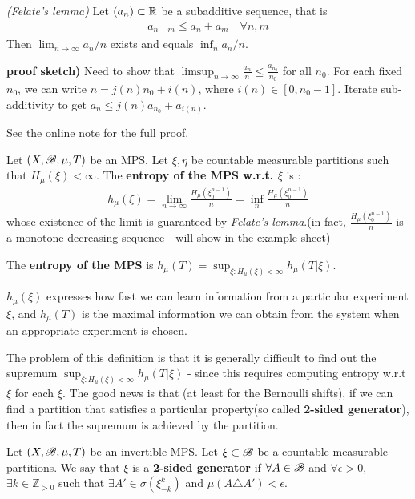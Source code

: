 \documentclass[10pt,a4paper]{report}
\newenvironment{proof}
{\begin{changemargin}{1cm}{0.5cm} 
	}%
	{\end{changemargin}
}
\begin{document}
\lem \emph{(Felate's lemma)} Let $(a_n)\subset \mathbb{R}$ be a subadditive sequence, that is
\begin{align*}
a_{n+m} \leq a_n + a_m \quad \forall n,m
\end{align*}
Then $\lim_{n\rightarrow \infty} a_n/n$ exists and equals $\inf_{n} a_n /n $.
\begin{proof}
\textbf{proof sketch)} Need to show that $\limsup_{n\rightarrow \infty} \frac{a_n}{n} \leq \frac{a_{n_0}}{n_0}$ for all $n_0$. For each fixed $n_0$, we can write $n = j(n)n_0 + i(n)$, where $i(n) \in [0,n_0-1]$. Iterate sub-additivity to get $a_n \leq j(n) a_{n_0} + a_{i(n)}$.

\quad See the online note for the full proof.
\end{proof}
\s

 Let $(X,\mathscr{B}, \mu, T)$ be an MPS. Let $\xi, \eta$ be countable measurable partitions such that $H_{\mu}(\xi) < \infty$. The \textbf{entropy of the MPS w.r.t. $\xi$} is :
\begin{align*}
h_{\mu} (\xi) = \lim_{n\rightarrow \infty} \frac{H_{\mu}(\xi_0^{n-1})}{n} = \inf_n \frac{H_{\mu}(\xi_0^{n-1})}{n}
\end{align*}
whose existence of the limit is guaranteed by \emph{Felate's lemma}.(in fact, $\frac{H_{\mu}(\xi_0^{n-1})}{n}$ is a monotone decreasing sequence - will show in the example sheet)

\quad The \textbf{entropy of the MPS} is $h_{\mu}(T) = \sup_{\xi : H_{\mu}(\xi)<\infty} h_{\mu}(T|\xi)$.
\s

$h_{\mu} (\xi)$ expresses how fast we can learn information from a particular experiment $\xi$, and $h_{\mu}(T)$ is the maximal information we can obtain from the system when an appropriate experiment is chosen.
\s

The problem of this definition is that it is generally difficult to find out the supremum $\sup_{\xi : H_{\mu}(\xi)<\infty} h_{\mu}(T|\xi)$ - since this requires computing entropy w.r.t $\xi$ for each $\xi$. The good news is that (at least for the Bernoulli shifts), if we can find a partition that satisfies a particular property(so called \textbf{2-sided generator}), then in fact the supremum is achieved by the partition.
\s

 Let $(X,\mathscr{B}, \mu, T)$ be an invertible MPS. Let $\xi \subset \mathscr{B}$ be a countable measurable partitions. We say that $\xi$ is a \textbf{2-sided generator} if $\forall A\in \mathscr{B}$ and $\forall \epsilon >0$, $\exists k\in \mathbb{Z}_{>0}$ such that $\exists A'\in \sigma( \xi^k_{-k} )$ and $\mu(A \triangle A') <\epsilon$.
\s
\end{document}
